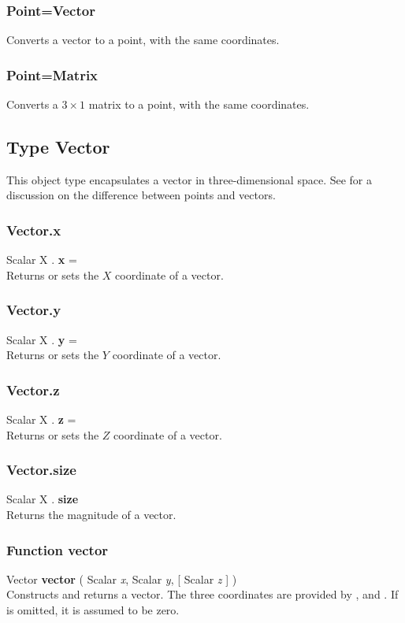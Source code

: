 \subsubsection{Point=Vector \label{C:Point=Vector}}
Converts a vector to a point, with the same coordinates.

\subsubsection{Point=Matrix \label{C:Point=Matrix}}
Converts a $3 \times 1$ matrix  to a point, with the same coordinates.

\subsection{Type Vector \label{T:Vector}}
This object type encapsulates a vector in three-dimensional space. See  for a discussion on the difference between points and vectors.

\subsubsection{Vector.x \label{F:Vector:x}}
Scalar X . \textbf{x} = \\
Returns or sets the $X$ coordinate of a vector.

\subsubsection{Vector.y \label{F:Vector:y}}
Scalar X . \textbf{y} = \\
Returns or sets the $Y$ coordinate of a vector.


\subsubsection{Vector.z \label{F:Vector:z}}
Scalar X . \textbf{z} = \\
Returns or sets the $Z$ coordinate of a vector.


\subsubsection{Vector.size \label{F:Vector:size}}
Scalar X . \textbf{size} \\
Returns the magnitude of a vector.

\subsubsection{Function vector \label{F:vector}}
Vector \textbf{vector} ( Scalar \textit{x}, Scalar \textit{y},  [ Scalar \textit{z} ] ) \\
Constructs and returns a vector. The three coordinates are provided by ,  and . If  is omitted, it is assumed to be zero.

